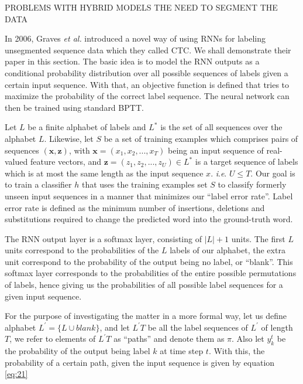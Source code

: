 
PROBLEMS WITH HYBRID MODELS
THE NEED TO SEGMENT THE DATA


In 2006, Graves \textit{et al.} introduced a novel way of using \ac{RNN}s for labeling unsegmented sequence data which they called \ac{CTC}. We shall demonstrate their paper in this section. 
The basic idea is to model the \ac{RNN} outputs as a conditional probability distribution over all possible sequences of labels given a certain input sequence. With that, an objective function is defined that tries to maximize the probability of the correct label sequence. The neural network can then be trained using standard \ac{BPTT}.

Let $L$ be a finite alphabet of labels and $L^*$ is the set of all sequences over the alphabet $L$. Likewise, let $S$ be a set of training examples which comprises pairs of sequences $(\mathbf{x},\mathbf{z})$, with $\mathbf{x} = (x_1, x_2,..., x_T)$ being an input sequence of real-valued feature vectors, and $\mathbf{z} = (z_1, z_2,..., z_U) \in L^*$ is a target sequence of labels which is at most the same length as the input sequence $x$. \textit{i}.\textit{e}. $U \leq T$. Our goal is to train a classifier $h$ that uses the training examples set $S$ to classify formerly unseen input sequences in a manner that minimizes our \enquote{label error rate}. Label error rate is defined as the minimum number of insertions, deletions and substitutions required to change the predicted word into the ground-truth word.

The \ac{RNN} output layer is a softmax layer, consisting of $|L|+1$ units. The first $L$ units correspond to the probabilities of the $L$ labels of our alphabet, the extra unit correspond to the probability of the output being no label, or \enquote{blank}. This softmax layer corresponds to the probabilities of the entire possible permutations of labels, hence giving us the probabilities of all possible label sequences for a given input sequence.


For the purpose of investigating the matter in a more formal way, let us define alphabet $L^{'} = \{L \cup {blank}\}$, and let ${L^{'}T}$ be all the label sequences of $L^{'}$ of length $T$, we refer to elements of ${L^{'}T}$ as \enquote{paths} and denote them as $\pi$. Also let $y_{k}^{t}$ be the probability of the output being label $k$ at time step $t$. With this, the probability of a certain path, given the input sequence is given by equation \ref{eq:21}

